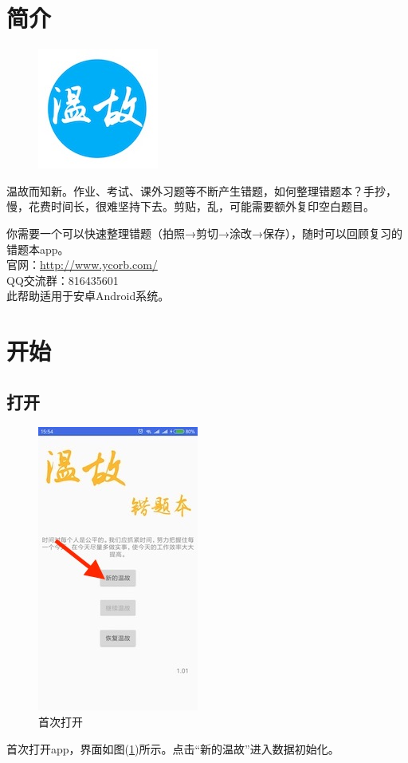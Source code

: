 \section{简介}

\begin{figure}[H]
\centering
\includegraphics{img/logo.jpg}
\end{figure}
温故而知新。作业、考试、课外习题等不断产生错题，如何整理错题本？手抄，慢，花费时间长，很难坚持下去。剪贴，乱，可能需要额外复印空白题目。

你需要一个可以快速整理错题（拍照→剪切→涂改→保存），随时可以回顾复习的错题本app。\\

官网：\url{http://www.ycorb.com/}\\

QQ交流群：816435601\\

此帮助适用于安卓Android系统。


\section{开始}
\subsection{打开}
\begin{figure}[H]
	\centering
	\includegraphics{img/1.jpg}
	\caption{首次打开}
	\label{img1}
\end{figure}
首次打开app，界面如图(\ref{img1})所示。点击“新的温故”进入数据初始化。

